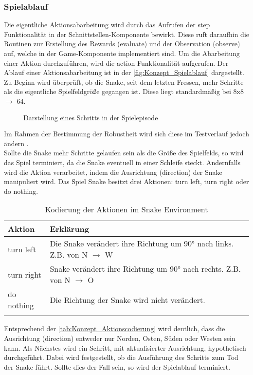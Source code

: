 \subsubsection{Spielablauf} \label{subsubsec:Konzept_Spielablauf}
Die eigentliche Aktionsabarbeitung wird durch das Aufrufen der step Funktionalität in der Schnittstellen-Komponente  bewirkt. Diese ruft daraufhin die Routinen zur Erstellung des Rewards (evaluate) und der Observation (observe) auf, welche in der Game-Komponente implementiert sind.
Um die Abarbeitung einer Aktion durchzuführen, wird die action Funktionalität aufgerufen. Der Ablauf einer Aktionsabarbeitung ist in der \autoref{fig:Konzept_Spielablauf} dargestellt. Zu Beginn wird überprüft, ob die Snake, seit dem letzten Fressen, mehr Schritte als die eigentliche Spielfeldgröße gegangen ist. Diese liegt standardmäßig bei 8x8 $\longrightarrow$ 64.
\begin{figure}[H]
	\centering
	
	\caption[Spielablauf]{Darstellung eines Schritts in der Spielepisode}
	\label{fig:Konzept_Spielablauf}
\end{figure}
Im Rahmen der Bestimmung der Robustheit wird sich diese im Testverlauf jedoch ändern .\\
Sollte die Snake mehr Schritte gelaufen sein als die Größe des Spielfelds, so wird das Spiel terminiert, da die Snake eventuell in einer Schleife steckt.
Andernfalls wird die Aktion verarbeitet, indem die Ausrichtung (direction) der Snake manipuliert wird. Das Spiel Snake besitzt drei Aktionen: turn left, turn right oder do nothing.
\begin{longtable}[h]{|p{3cm}|p{\linewidth - 4cm}|}
	\hline
	Aktion & Erklärung \\
	\hline
	turn left & Die Snake verändert ihre Richtung um 90° nach links. Z.B. von N $\longrightarrow$ W \\
	\hline
	turn right & Snake verändert ihre Richtung um 90° nach rechts. Z.B. von N $\longrightarrow$ O \\
	\hline
	do nothing & Die Richtung der Snake wird nicht verändert. \\
	\hline
	\caption{Kodierung der Aktionen im Snake Environment}
	\label{tab:Konzept_Aktionscodierung} 
\end{longtable}
Entsprechend der \autoref{tab:Konzept_Aktionscodierung} wird deutlich, dass die Ausrichtung (direction) entweder nur Norden, Osten, Süden oder Westen sein kann.
Als Nächstes wird ein Schritt, mit aktualisierter Ausrichtung, hypothetisch durchgeführt. Dabei wird festgestellt, ob die Ausführung des Schritts zum Tod der Snake führt. Sollte dies der Fall sein, so wird der Spielablauf terminiert.

